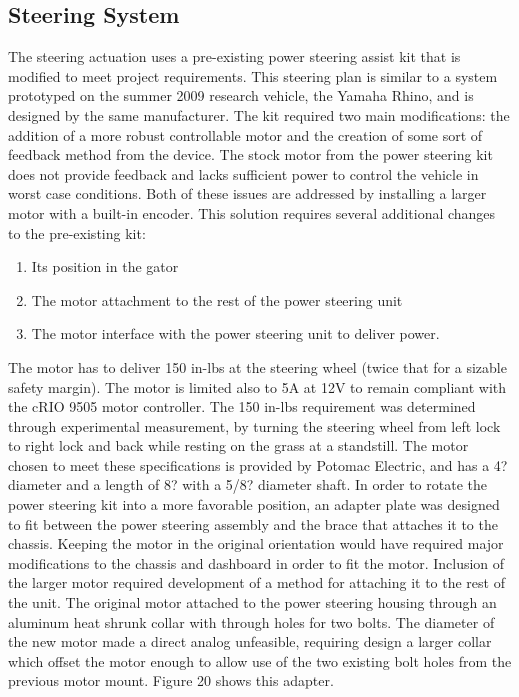 \newpage

\subsection{Steering System}
The steering actuation uses a pre-existing power steering assist kit that is modified to meet project requirements. This steering plan is similar to a system prototyped on the summer 2009 research vehicle, the Yamaha Rhino, and is designed by the same manufacturer. The kit required two main modifications: the addition of a more robust controllable motor and the creation of some sort of feedback method from the device. The stock motor from the power steering kit does not provide feedback and lacks sufficient power to control the vehicle in worst case conditions. Both of these issues are addressed by installing a larger motor with a built-in encoder. This solution requires several additional changes to the pre-existing kit: 

\begin{enumerate}
\item Its position in the gator
\item The motor attachment to the rest of the power steering unit
\item The motor interface with the power steering unit to deliver power.
\end{enumerate}

\noindent The motor has to deliver 150 in-lbs at the steering wheel (twice that for a sizable safety margin). The motor is limited also to 5A at 12V to remain compliant with the cRIO 9505 motor controller. The 150 in-lbs requirement was determined through experimental measurement, by turning the steering wheel from left lock to right lock and back while resting on the grass at a standstill. The motor chosen to meet these specifications is provided by Potomac Electric, and has a 4? diameter and a length of 8? with a 5/8? diameter shaft. In order to rotate the power steering kit into a more favorable position, an adapter plate was designed to fit between the power steering assembly and the brace that attaches it to the chassis. Keeping the motor in the original orientation would have required major modifications to the chassis and dashboard in order to fit the motor. Inclusion of the larger motor required development of a method for attaching it to the rest of the unit. The original motor attached to the power steering housing through an aluminum heat shrunk collar with through holes for two bolts. The diameter of the new motor made a direct analog unfeasible, requiring design a larger collar which offset the motor enough to allow use of the two existing bolt holes from the previous motor mount. Figure 20 shows this adapter.


